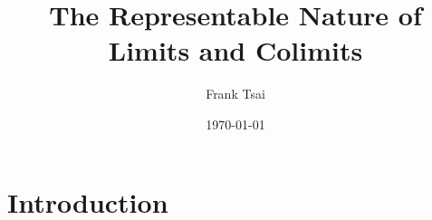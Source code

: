 \documentclass{amsart}
\title{The Representable Nature of Limits and Colimits}
\author{Frank Tsai}
\date{\today}
\begin{document}
\maketitle
\tableofcontents

\section{Introduction}
\label{sec:introduction}





\end{document}
